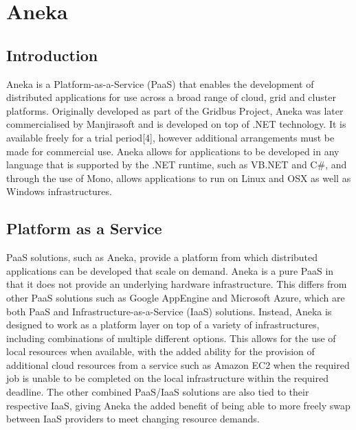 \chapter{Aneka}
\section{Introduction}
Aneka is a Platform-as-a-Service (PaaS) that enables the development of distributed applications for use across a broad range of cloud, grid and cluster platforms. Originally developed as part of the Gridbus Project, Aneka was later commercialised by Manjirasoft and is developed on top of .NET technology. It is available freely for a trial period[4], however additional arrangements must be made for commercial use. Aneka allows for applications to be developed in any language that is supported by the .NET runtime, such as VB.NET and C\#, and through the use of Mono, allows applications to run on Linux and OSX as well as Windows infrastructures\cite{Aneka}.

\section{Platform as a Service}
PaaS solutions, such as Aneka, provide a platform from which distributed applications can be developed that scale on demand\cite{CloudBus}. Aneka is a pure PaaS in that it does not provide an underlying hardware infrastructure. This differs from other PaaS solutions such as Google AppEngine and Microsoft Azure, which are both PaaS and Infrastructure-as-a-Service (IaaS) solutions. Instead, Aneka is designed to work as a platform layer on top of a variety of infrastructures, including combinations of multiple different options. This allows for the use of local resources when available, with the added ability for the provision of additional cloud resources from a service such as Amazon EC2 when the required job is unable to be completed on the local infrastructure within the required deadline. The other combined PaaS/IaaS solutions are also tied to their respective IaaS, giving Aneka the added benefit of being able to more freely swap between IaaS providers to meet changing resource demands.

